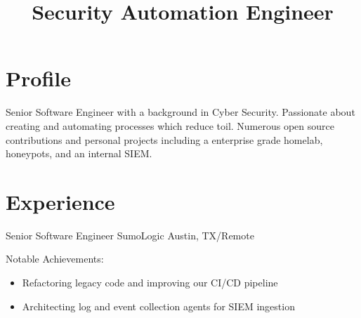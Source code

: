 \documentclass[11pt,a4paper,sans]{moderncv}
\title{Security Automation Engineer}
\begin{document}
\makecvtitle
\vspace*{-10mm}
\section{Profile}


Senior Software Engineer with a background in Cyber Security. Passionate about creating and automating processes which reduce toil. Numerous open source contributions and personal projects including a enterprise grade homelab, honeypots, and an internal SIEM.




\section{Experience}
{Senior Software Engineer}
{SumoLogic}
{Austin, TX/Remote}
{}
{Notable Achievements:
    \begin{itemize}%
        \setlength\itemsep{.25em}
        \item Refactoring legacy code and improving our CI/CD pipeline
        \item Architecting log and event collection agents for SIEM ingestion
    \end{itemize}}
\end{document}
